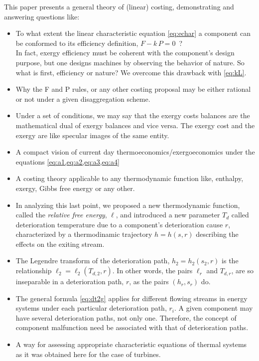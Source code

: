 \documentclass[energies,article,submit,moreauthors,pdftex]{Definitions/mdpi}
\begin{document}
This paper presents a general theory of (linear) costing, demonstrating and answering questions like:
\begin{itemize}
	\item To what extent the linear characteristic equation \eqref{eq:echar} a component can be conformed to its efficiency definition, $F - k\, P = 0$~?\\
	In fact, exergy efficiency must be coherent with the component's design purpose, but one designs machines by observing the behavior of nature. So what is first, efficiency or nature? We overcome this drawback with \cref{eq:kL}.
	\item Why the F and P rules, or any other costing proposal may be either rational or not under a given disaggregation scheme.
	\item Under a set of conditions, we may say that the exergy costs balances are the mathematical dual of exergy balances and vice versa. The exergy cost and the exergy are like specular images of the same entity.
	\item A compact vision of current day thermoeconomics/exergoeconomics under the equations \cref{eq:a1,eq:a2,eq:a3,eq:a4}
	\item A costing theory applicable to any thermodynamic function like, enthalpy, exergy, Gibbs free energy or any other.
	\item In analyzing this last point, we proposed a new thermodynamic function, called the \emph{relative free energy}, $\ell$, and introduced a new parameter $T_d$ called deterioration temperature due to a component’s deterioration cause $r$, characterized by a thermodinamic trajectory $h=h(s, r)$ describing the effects on the exiting stream. 
	\item The Legendre transform of the deterioration path, $h_2=h_2 (s_2, r)$ is the relationship  
	$\ell_2 = \ell_2(T_{d,2} , r)$. In other words, the pairs  $\ell_r$ and $T_{d,r}$, are so inseparable in a deterioration path, $r$, as the pairs $(h_r,s_r)$ do.
	\item The general formula \eqref{eq:dt2g} applies for different flowing streams in energy systems under each particular deterioration path, $r_i$. A given component may have several deterioration paths, not only one. Therefore, the concept of component malfunction need be associated with that of deterioration paths.
	\item A way for assessing appropriate characteristic equations of thermal systems as it was obtained here for the case of  turbines.
\end{itemize}
\end{document}
